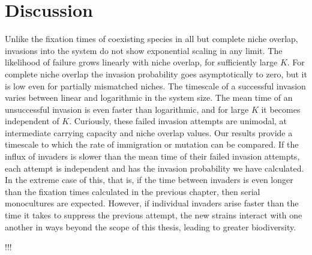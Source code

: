 \section{Discussion}
Unlike the fixation times of coexisting species in all but complete niche overlap, invasions into the system do not show exponential scaling in any limit. 
The likelihood of failure grows linearly with niche overlap, for sufficiently large $K$. 
For complete niche overlap the invasion probability goes asymptotically to zero, but it is low even for partially mismatched niches. 
The timescale of a successful invasion varies between linear and logarithmic in the system size. 
The mean time of an unsuccessful invasion is even faster than logarithmic, and for large $K$ it becomes independent of $K$. 
Curiously, these failed invasion attempts are unimodal, at intermediate carrying capacity and niche overlap values. %
Our results provide a timescale to which the rate of immigration or mutation can be compared. 
If the influx of invaders is slower than the mean time of their failed invasion attempts, each attempt is independent and has the invasion probability we have calculated. 
In the extreme case of this, that is, if the time between invaders is even longer than the fixation times calculated in the previous chapter, then serial monocultures are expected. 
However, if individual invaders arise faster than the time it takes to suppress the previous attempt, the new strains interact with one another in ways beyond the scope of this thesis, leading to greater biodiversity. 


!!!%

